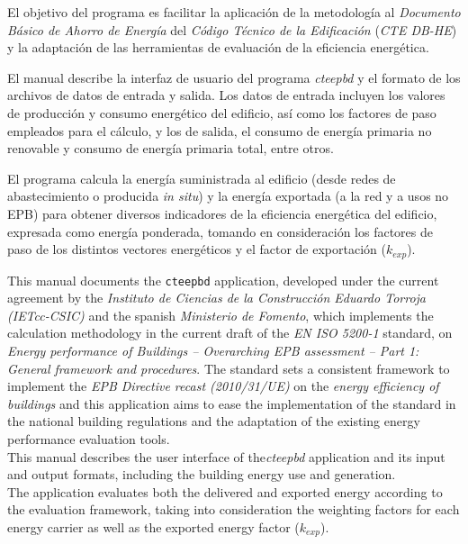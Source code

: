 \documentclass[10pt,notitlepage,oneside,a4paper]{article}
\begin{document}
El objetivo del programa es facilitar la aplicación de la metodología al \textit{Documento Básico de Ahorro de Energía} del \textit{Código Técnico de la Edificación} (\textit{CTE DB-HE}) y la adaptación de las herramientas de evaluación de la eficiencia energética.

El manual describe la interfaz de usuario del programa \textit{cteepbd} y el formato de los archivos de datos de entrada y salida. Los datos de entrada incluyen los valores de producción y consumo energético del edificio, así como los factores de paso empleados para el cálculo, y los de salida, el consumo de energía primaria no renovable y consumo de energía primaria total, entre otros.

El programa calcula la energía suministrada al edificio (desde redes de abastecimiento o producida \textit{in situ}) y la energía exportada (a la red y a usos no EPB) para obtener diversos indicadores de la eficiencia energética del edificio, expresada como energía ponderada, tomando en consideración los factores de paso de los distintos vectores energéticos y el factor de exportación ($k_{exp}$).

\begin{myquote}\footnotesize
This manual documents the \texttt{cteepbd} application, developed under the current agreement by the \textit{Instituto de Ciencias de la Construcción Eduardo Torroja (IETcc-CSIC)} and the spanish \textit{Ministerio de Fomento}, which implements the calculation methodology in the current draft of the \textit{EN ISO 5200-1} standard, on \textit{Energy performance of Buildings -- Overarching EPB assessment -- Part 1: General framework and procedures}. The standard sets a consistent framework to implement the \textit{EPB Directive recast (2010/31/UE)} on the \textit{energy efficiency of buildings} and this application aims to ease the implementation of the standard in the national building regulations and the adaptation of the existing energy performance evaluation tools.
\\

This manual describes the user interface of the\textit{cteepbd} application and its input and output formats, including the building energy use and generation.
\\

The application evaluates both the delivered and exported energy according to the evaluation framework, taking into consideration the weighting factors for each energy carrier as well as the exported energy factor ($k_{exp}$).
\end{myquote}
\end{document}

